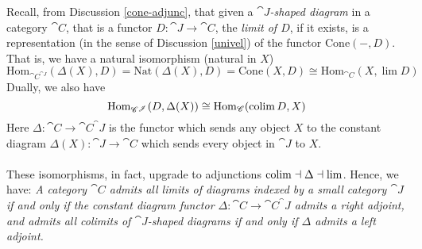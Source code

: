 \begin{remark}
Recall, from Discussion \ref{cone-adjunc}, that given a \emph{$\cat{J}$-shaped diagram} in a category $\cat{C}$, that is a functor $D: \cat{J} \to \cat{C}$, the \emph{limit of $D$}, if it exists, is a representation (in the sense of Discussion \ref{univel}) of the functor $\mathrm{Cone}(-,D)$. That is, we have a natural isomorphism (natural in $X$)
\[\mathrm{Hom}_{\cat{C}^{\cat{J}}}(\Delta(X),D) = \mathrm{Nat}(\Delta(X),D) = \mathrm{Cone}(X,D) \cong \mathrm{Hom}_{\cat{C}}(X,\lim D)\]
Dually, we also have
\[\mathrm{Hom}_{\mathscr{C}^{\mathscr{J}}}(D,\Delta(X)) \cong \mathrm{Hom}_{\mathscr{C}}(\operatorname{colim} D,X)\]
Here $\Delta:\cat{C} \to \cat{C}^\cat{J}$ is the functor which sends any object $X$ to the constant diagram $\Delta(X):\cat{J} \to \cat{C}$ which sends every object in $\cat{J}$ to $X$.\\
\\
These isomorphisms, in fact, upgrade to adjunctions $\operatorname{colim} \dashv \Delta \dashv \lim$. Hence, we have: \emph{A category $\cat{C}$ admits all limits of diagrams indexed by a small category $\cat{J}$ if and only if the constant diagram functor $\Delta:\cat{C} \to \cat{C}^\cat{J}$ admits a right adjoint, and admits all colimits of $\cat{J}$-shaped diagrams if and only if $\Delta$ admits a left adjoint.}
\end{remark}

\vspace*{0.1in}

